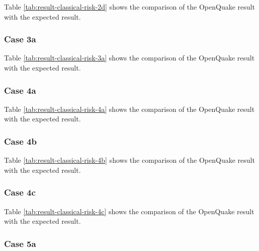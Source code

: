 

Table \ref{tab:result-classical-risk-2d} shows the comparison of the OpenQuake result with the expected result.

\subsubsection{Case 3a}




Table \ref{tab:result-classical-risk-3a} shows the comparison of the OpenQuake result with the expected result.

\subsubsection{Case 4a}




Table \ref{tab:result-classical-risk-4a} shows the comparison of the OpenQuake result with the expected result.

\subsubsection{Case 4b}




Table \ref{tab:result-classical-risk-4b} shows the comparison of the OpenQuake result with the expected result.

\subsubsection{Case 4c}




Table \ref{tab:result-classical-risk-4c} shows the comparison of the OpenQuake result with the expected result.

\subsubsection{Case 5a}


